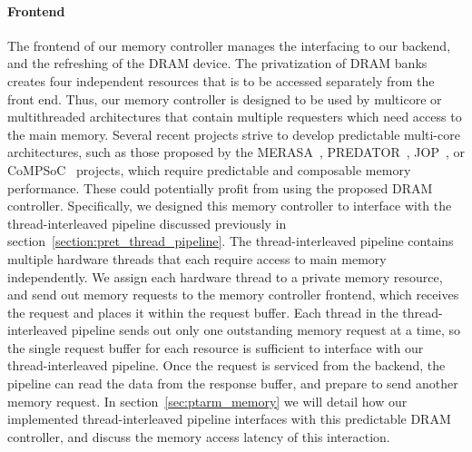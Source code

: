 \paragraph{Frontend}
The frontend of our memory controller manages the interfacing to our backend, and the refreshing of the DRAM device.
The privatization of DRAM banks creates four independent resources that is to be accessed separately from the front end.
Thus, our memory controller is designed to be used by multicore or multithreaded architectures that contain multiple requesters which need access to the main memory.
Several recent projects strive to develop predictable multi-core architectures, such as those proposed by the MERASA~\cite{Ungerer10}, PREDATOR~\cite{Wilhelm09}, JOP~\cite{Schoeberl2008265}, or CoMPSoC~\cite{Hansson09} projects, which require predictable and composable memory performance.
These could potentially profit from using the proposed DRAM controller.
Specifically, we designed this memory controller to interface with the thread-interleaved pipeline discussed previously in section~\ref{section:pret_thread_pipeline}.
The thread-interleaved pipeline contains multiple hardware threads that each require access to main memory independently. 
We assign each hardware thread to a private memory resource, and send out memory requests to the memory controller frontend, which receives the request and places it within the request buffer.
Each thread in the thread-interleaved pipeline sends out only one outstanding memory request at a time, so the single request buffer for each resource is sufficient to interface with our thread-interleaved pipeline.
Once the request is serviced from the backend, the pipeline can read the data from the response buffer, and prepare to send another memory request.    
In section~\ref{sec:ptarm_memory} we will detail how our implemented thread-interleaved pipeline interfaces with this predictable DRAM controller, and discuss the memory access latency of this interaction.

